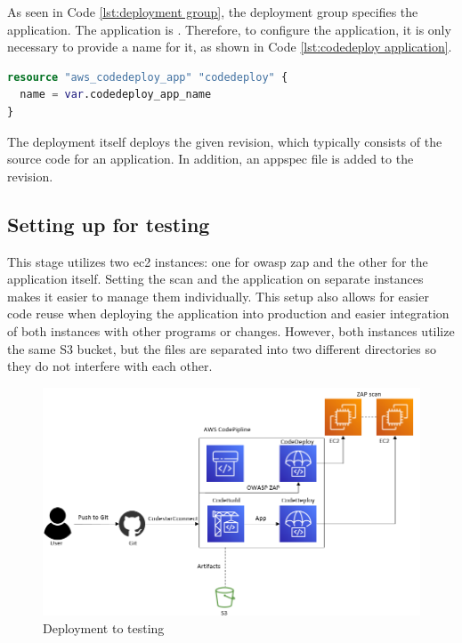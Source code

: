 As seen in Code \ref{lst:deployment group}, the deployment group specifies the application. The application is  \cite{CodeDeployApplication}. Therefore, to configure the application, it is only necessary to provide a name for it, as shown in Code \ref{lst:codedeploy application}.

\vspace{2mm}
\begin{lstlisting}[language=terraform, caption=Create an application for the deployment, captionpos=b, frame=single, label= lst:codedeploy application]
resource "aws_codedeploy_app" "codedeploy" {
  name = var.codedeploy_app_name
}
\end{lstlisting}

The deployment itself deploys the given revision, which typically consists of the source code for an application. In addition, an \gls{appspec} file is added to the revision. 

\subsection{Setting up for testing}

This stage utilizes two \acrshort{ec2} instances: one for \acrshort{owasp} \acrshort{zap} and the other for the application itself. Setting the scan and the application on separate instances makes it easier to manage them individually. This setup also allows for easier code reuse when deploying the application into production and easier integration of both instances with other programs or changes. However, both instances utilize the same S3 bucket, but the files are separated into two different directories so they do not interfere with each other.

\vspace{2mm}
\begin{figure}[H]
    \centering
    \includegraphics[width=0.6\columnwidth]{Images/aws-piplin-5.png}
    \caption{Deployment to testing}
    \label{fig: Deployment to testing}
\end{figure}

